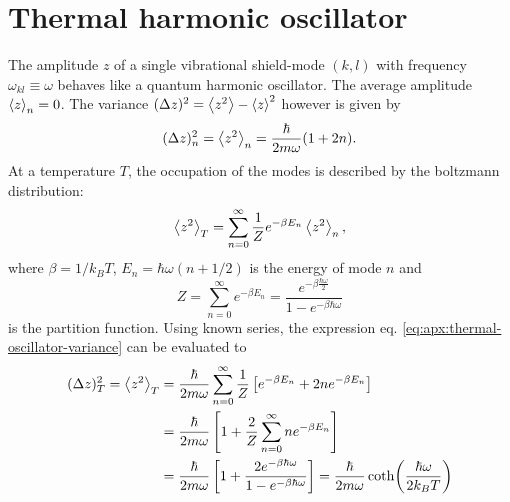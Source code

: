 \section{Thermal harmonic oscillator}\label{apx:thermal-harmonic-oscillator}
The amplitude $z$ of a single vibrational shield-mode $(k,l)$ with frequency $\omega_{kl} \equiv \omega$ behaves like a quantum harmonic oscillator. 
The average amplitude $\left\langle z\right\rangle_n = 0$. 
The variance $(\Delta z)^2 = \left\langle z^2\right\rangle - \left\langle z\right\rangle^2$ however is given by
\begin{equation}
  (\Delta z)^2_n = \left\langle z^2\right\rangle_n = \frac{\hbar}{2m\omega} (1+2n) .
\end{equation}
At a temperature $T$, the occupation of the modes is described by the boltzmann distribution:
\begin{equation}\label{eq:apx:thermal-oscillator-variance}
  \left\langle z^2\right\rangle_T = \sum_{n=0}^{\infty} \frac{1}{Z} e^{-\beta E_n} \left\langle z^2\right\rangle_n,
\end{equation}
where $\beta = 1/k_B T$, $E_n = \hbar \omega (n+1/2)$ is the energy of mode $n$ and
\begin{equation}
  Z = \sum_{n=0}^{\infty} e^{-\beta E_n} = \frac{e^{-\beta \frac{\hbar \omega}{2}}}{1-e^{-\beta \hbar \omega}}
\end{equation}
is the partition function. Using known series, the expression eq. \eqref{eq:apx:thermal-oscillator-variance} can be evaluated to
\begin{align}
  (\Delta z)^2_T = \left\langle z^2\right\rangle_T &= \frac{\hbar}{2m\omega} \sum_{n=0}^{\infty} \frac{1}{Z}\left[e^{-\beta E_n} + 2ne^{-\beta E_n}\right] \\
  &= \frac{\hbar}{2m\omega} \left[1 + \frac{2}{Z}\sum_{n=0}^{\infty} n e^{-\beta E_n}\right] \\
  &= \frac{\hbar}{2m\omega} \left[1 + \frac{2e^{-\beta\hbar\omega}}{1-e^{-\beta\hbar\omega}} \right] = \frac{\hbar}{2m\omega} \coth(\frac{\hbar \omega}{2 k_B T})
\end{align}